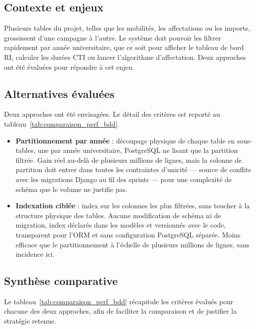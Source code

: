 \subsection{Contexte et enjeux}

Plusieurs tables du projet, telles que les mobilités, les affectations ou les imports,
grossissent d'une campagne à l'autre. Le système doit pouvoir les
filtrer rapidement par année universitaire, que ce soit pour afficher
le tableau de bord RI, calculer les durées CTI ou lancer l'algorithme
d'affectation. Deux approches ont été évaluées pour répondre à cet
enjeu.

\subsection{Alternatives évaluées}

Deux approches ont été envisagées. Le détail des critères est reporté au tableau~\ref{tab:comparaison_perf_bdd}.

\begin{itemize}
  \item \textbf{Partitionnement par année} : découpage physique de chaque table en sous-tables, une par année universitaire, PostgreSQL ne lisant que la partition filtrée. Gain réel au-delà de plusieurs millions de lignes, mais la colonne de partition doit entrer dans toutes les contraintes d'unicité — source de conflits avec les migrations Django au fil des sprints — pour une complexité de schéma que le volume ne justifie pas.
  \item \textbf{Indexation ciblée} : index sur les colonnes les plus filtrées, sans toucher à la structure physique des tables. Aucune modification de schéma ni de migration, index déclarés dans les modèles et versionnés avec le code, transparent pour l'ORM et sans configuration PostgreSQL séparée. Moins efficace que le partitionnement à l'échelle de plusieurs millions de lignes, sans incidence ici.
\end{itemize}

\subsection{Synthèse comparative}

Le tableau~\ref{tab:comparaison_perf_bdd} récapitule les critères évalués pour chacune des
deux approches, afin de faciliter la comparaison et de justifier
la stratégie retenue.

